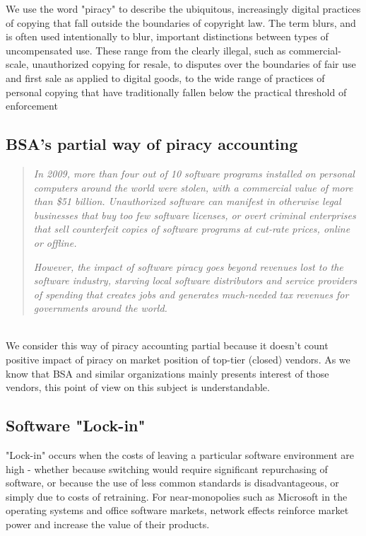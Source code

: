 \documentclass[times, utf8, seminar]{fit}
\begin{document}
We use the word "piracy" to describe the ubiquitous, increasingly digital practices of copying that fall outside the boundaries of copyright law. The term blurs, and is often used intentionally to blur, important distinctions between types of uncompensated use. These range from the clearly illegal, such as commercial-scale, unauthorized copying for resale, to disputes over the boundaries of fair use and first sale as applied to digital goods, to the wide range of practices of personal copying that have traditionally fallen below the practical threshold of enforcement\citep{mediapiracy}


\subsection{BSA's partial way of piracy accounting}


\begin{quotation}
\emph{In 2009, more than four out of 10 software programs installed on personal computers around the world were stolen, with a commercial value of more than \$51 billion. Unauthorized software can manifest in otherwise legal businesses that buy too few software licenses, or overt criminal enterprises that sell counterfeit copies of software programs at cut-rate prices, online or offline.}

\emph{However, the impact of software piracy goes beyond revenues lost to the software industry, starving local software distributors and service providers of spending that creates jobs and generates much-needed tax revenues for governments around the world.}\citep{bsapiracyimpact}
\end{quotation}\\

We consider this way of piracy accounting partial because it doesn't count positive impact of piracy on market position of top-tier (closed) vendors. As we know that BSA and similar organizations mainly presents interest of those vendors, this point of view on this subject is understandable.  

\subsection{Software "Lock-in"}

"Lock-in" occurs when the costs of leaving a particular software environment are high - whether because switching would require significant repurchasing of software, or because the use of less common standards is disadvantageous, or simply due to costs of retraining. For near-monopolies such as Microsoft in the operating systems and office software markets, network effects reinforce market power and increase the value of their products.
\end{document}
